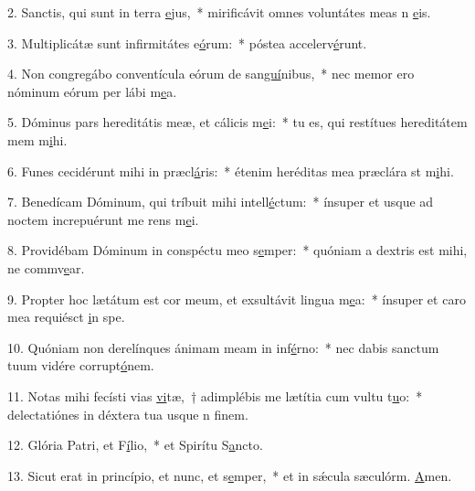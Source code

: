 2. Sanctis, qui sunt in terra \uline{e}jus,~* mirificávit omnes voluntátes meas n \uline{e}is.\par 
3. Multiplicátæ sunt infirmitátes e\uline{ó}rum:~* póstea accelerv\uline{é}runt.\par 
4. Non congregábo conventícula eórum de san\uline{guí}nibus,~* nec memor ero nóminum eórum per lábi m\uline{e}a.\par 
5. Dóminus pars hereditátis meæ, et cálicis m\uline{e}i:~* tu es, qui restítues hereditátem mem m\uline{i}hi.\par 
6. Funes cecidérunt mihi in præcl\uline{á}ris:~* étenim heréditas mea præclára st m\uline{i}hi.\par 
7. Benedícam Dóminum, qui tríbuit mihi intell\uline{é}ctum:~* ínsuper et usque ad noctem increpuérunt me rens m\uline{e}i.\par 
8. Providébam Dóminum in conspéctu meo s\uline{e}mper:~* quóniam a dextris est mihi, ne commv\uline{e}ar.\par 
9. Propter hoc lætátum est cor meum, et exsultávit lingua m\uline{e}a:~* ínsuper et caro mea requiésct \uline{i}n spe.\par 
10. Quóniam non derelínques ánimam meam in inf\uline{é}rno:~* nec dabis sanctum tuum vidére corrupt\uline{ó}nem.\par 
11. Notas mihi fecísti vias \uline{vi}tæ,~† adimplébis me lætítia cum vultu t\uline{u}o:~* delectatiónes in déxtera tua usque n f\uline{i}nem.\par 
12. Glória Patri, et F\uline{í}lio,~* et Spirítu S\uline{a}ncto.\par 
13. Sicut erat in princípio, et nunc, et s\uline{e}mper,~* et in sǽcula sæculórm. \uline{A}men.\par 
